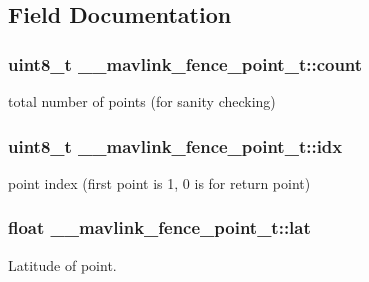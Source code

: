 \subsection{Field Documentation}
\hypertarget{struct____mavlink__fence__point__t_a48a53b209ef44b806ec995eadd154e86}{
\subsubsection[{count}]{\setlength{\rightskip}{0pt plus 5cm}uint8\+\_\+t \+\_\+\+\_\+mavlink\+\_\+fence\+\_\+point\+\_\+t\+::count}}\label{struct____mavlink__fence__point__t_a48a53b209ef44b806ec995eadd154e86}


total number of points (for sanity checking) 

\hypertarget{struct____mavlink__fence__point__t_adee07e538f3ac71bfca7be36b0bf6285}{
\subsubsection[{idx}]{\setlength{\rightskip}{0pt plus 5cm}uint8\+\_\+t \+\_\+\+\_\+mavlink\+\_\+fence\+\_\+point\+\_\+t\+::idx}}\label{struct____mavlink__fence__point__t_adee07e538f3ac71bfca7be36b0bf6285}


point index (first point is 1, 0 is for return point) 

\hypertarget{struct____mavlink__fence__point__t_afc9afaf3ccbc8f1caee31a090dbec1e8}{
\subsubsection[{lat}]{\setlength{\rightskip}{0pt plus 5cm}float \+\_\+\+\_\+mavlink\+\_\+fence\+\_\+point\+\_\+t\+::lat}}\label{struct____mavlink__fence__point__t_afc9afaf3ccbc8f1caee31a090dbec1e8}


Latitude of point. 

